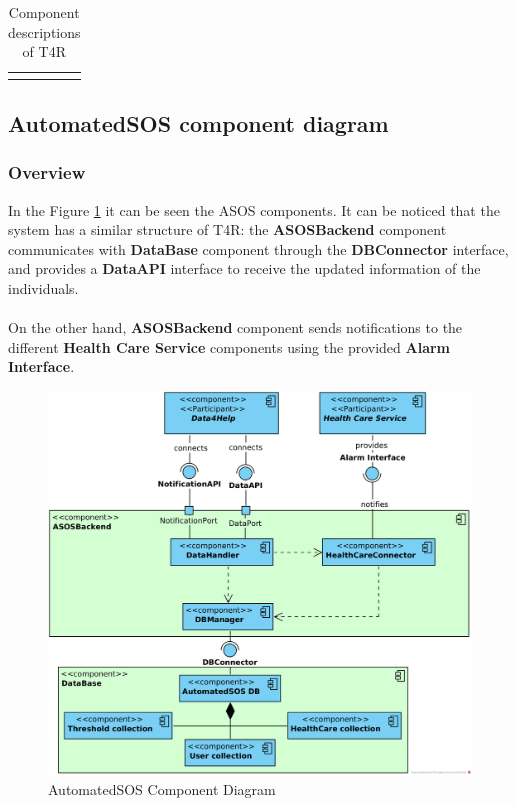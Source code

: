 \documentclass[a4paper, hidelinks, 12pt]{report}
\begin{document}
\begin{longtable}{l p{}}
			\hline
			\caption{Component descriptions of T4R}
			\label{table:t4r_component_descriptions}
		\end{longtable}
			
			\subsection{AutomatedSOS component diagram}
				\subsubsection{Overview}
			In the Figure \ref{fig:asos_component_diagram} it can be seen the ASOS components. It can be noticed that the system has a similar structure of T4R: the \textbf{ASOSBackend} component communicates  with \textbf{DataBase} component through the \textbf{DBConnector} interface, and provides a \textbf{DataAPI} interface to receive the updated information of the individuals.\\\\
			On the other hand, \textbf{ASOSBackend} component sends notifications to the different \textbf{Health Care Service} components using the provided \textbf{Alarm Interface}.
			\begin{figure}[H]
				\centering
				\includegraphics[width=1\textwidth]{diagrams/asos_component_diagram.png}
				\caption[AutomatedSOS Component Diagram]{AutomatedSOS Component Diagram}
				\label{fig:asos_component_diagram}
			\end{figure}	
\end{document}
